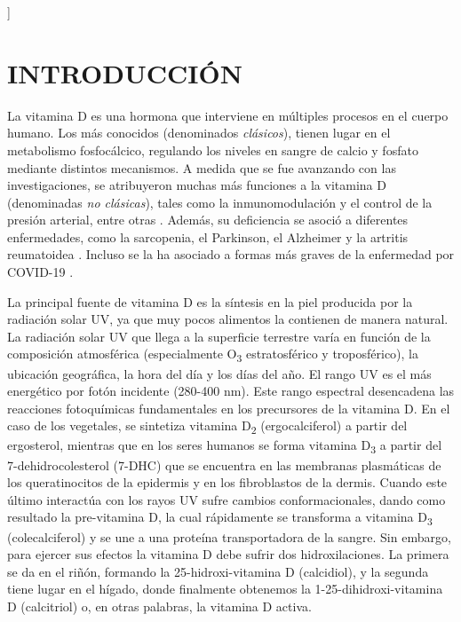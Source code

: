 \documentclass[10pt,twocolumn]{article}
\newcommand\cauthemail[1]{\footnotetext{#1}}
\begin{document}
\begin{@twocolumnfalse}
\begin{abstract}
\begin{minipage}{\dimexpr\paperwidth-6cm}
      \end{minipage}
      \vspace{4ex}
    \end{abstract}
  \end{@twocolumnfalse}
]
\thispagestyle{empty}

\setcounter{footnote}{1}
\cauthemail{ipina@ifir-conicet.gov.ar}  %
\section{INTRODUCCIÓN}
La vitamina D es una hormona que interviene en múltiples procesos en el cuerpo humano. Los más conocidos (denominados \emph{clásicos}), tienen lugar en el metabolismo fosfocálcico, regulando los niveles en sangre de calcio y fosfato mediante distintos mecanismos. A medida que se fue avanzando con las investigaciones, se atribuyeron muchas más funciones a la vitamina D (denominadas \emph{no clásicas}), tales como la inmunomodulación y el control de la presión arterial, entre otras \cite{bikle_2014,zuluga_2011,pozzo_2005}. Además, su deficiencia se asoció a diferentes enfermedades, como la sarcopenia, el Parkinson, el Alzheimer y la artritis reumatoidea \cite{pozzo_2005,Afzal_2013,Kravietz_2017,Ishikawa_2016}. Incluso se la ha asociado a formas más graves de la enfermedad por COVID-19 \cite{Mercola2020}.

La principal fuente de vitamina D es la síntesis en la piel producida por la radiación solar UV, ya que muy pocos alimentos la contienen de manera natural\cite{Biesalski_2002}. La radiación solar UV que llega a la superficie terrestre varía en función de la composición atmosférica (especialmente O\textsubscript{3} estratosférico y troposférico), la ubicación geográfica, la hora del día y los días del año. El rango UV es el más energético por fotón incidente (280-400 nm). Este rango espectral desencadena las reacciones fotoquímicas fundamentales en los precursores de la vitamina D. En el caso de los vegetales, se sintetiza vitamina D\textsubscript{2} (ergocalciferol) a partir del ergosterol, mientras que en los seres humanos se forma vitamina D\textsubscript{3} a partir del 7-dehidrocolesterol (7-DHC) que se encuentra en las membranas plasmáticas de los queratinocitos de la epidermis y en los fibroblastos de la dermis.\cite{2002,brunser_radiacion_2005,Olds2008} Cuando este último interactúa con los rayos UV sufre cambios conformacionales, dando como resultado la pre-vitamina D, la cual rápidamente se transforma a vitamina D\textsubscript{3} (colecalciferol) y se une a una proteína transportadora de la sangre. Sin embargo, para ejercer sus efectos la vitamina D debe sufrir dos hidroxilaciones. La primera se da en el riñón, formando la 25-hidroxi-vitamina D (calcidiol), y la segunda tiene lugar en el hígado, donde finalmente obtenemos la 1-25-dihidroxi-vitamina D (calcitriol) o, en otras palabras, la vitamina D activa.\cite{Holick_1989}
\end{document}

